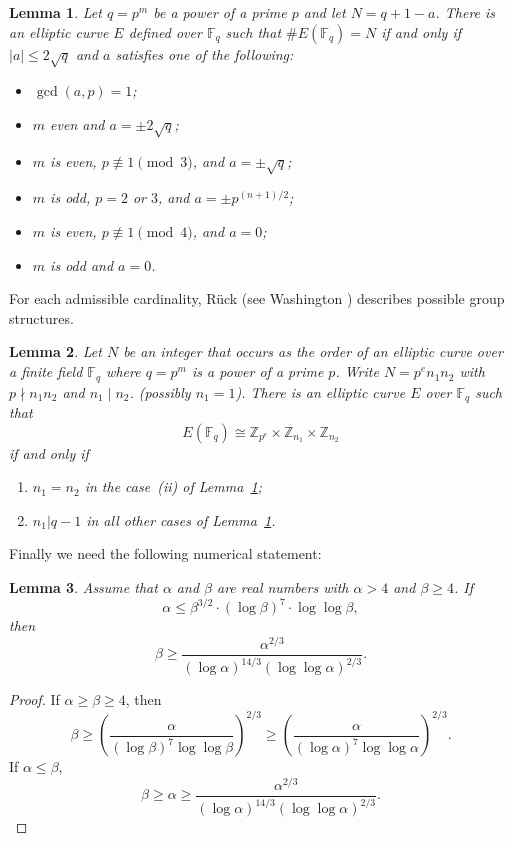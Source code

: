 \documentclass{amsart}
\def\Z{{\mathbb Z}}
\def\F{{\mathbb F}}
\newtheorem{lemma}{Lemma}
\begin{document}
\begin{lemma} 
\label{lem:Water}                          
 Let $q=p^m$ be a power of a prime $p$ and let $N = q + 1-a$. There is an elliptic 
curve $E$ defined over $\F_q$ such that $\#E(\F_q) = N$ if and only if $|a|\le 2\sqrt q$ 
and $a$ satisfies one of the following:
\begin{itemize} 
\item[(i)] $\gcd(a, p) = 1$;
\item[(ii)] $m$ even and $a=\pm 2\sqrt q$;
\item[(iii)] $m$ is even, $p\not\equiv 1 \pmod 3$, and $a = \pm\sqrt q$;
\item[(iv)] $m$ is odd, $p = 2$ or $3$, and $a = \pm p^{(n+1)/2}$;
\item[(v)] $m$ is even, $p\not\equiv 1 \pmod 4$, and $a = 0$;
\item[(vi)] $m$ is odd and $a = 0$.
\end{itemize}
\end{lemma}

For each admissible cardinality, R\"uck (see Washington \cite[Theorem~4.4, page~98]{washington})
describes possible group structures. 

\begin{lemma}
\label{lem:Ruck}
Let $N$ be an integer that occurs as the  order  of an elliptic curve 
over a finite field $\F_q$ where  $q=p^m$
is a power of a prime $p$.  Write 
$N = p^e n_1 n_2$ with $p\nmid n_1 n_2$ and $n_1\mid n_2$.
(possibly $n_1 = 1$). There is an elliptic curve $E$ over $\F_q$ such 
that
$$E(\F_q)\cong \Z_{p^e}\times\Z_{n_1}\times\Z_{n_2}$$
if and only if
\begin{enumerate}
\item $n_1 = n_2$ in the case~(ii) of Lemma~\ref{lem:Water};
\item $n_1 |q - 1$ in all other cases of Lemma~\ref{lem:Water}.
\end{enumerate}
\end{lemma}

Finally we need the following numerical statement:

\begin{lemma}\label{lem:numerical} Assume that $\alpha$ and $\beta$ are real numbers with $\alpha>4$ and $\beta\ge4$.
If 
$$\alpha\le \beta^{3/2}\cdot(\log\beta)^7\cdot\log\log\beta,$$
then
$$
\beta\ge\frac{\alpha^{2/3}}{(\log\alpha)^{14/3}(\log\log\alpha)^{2/3}}.$$
\end{lemma}

\begin{proof} If $\alpha\ge\beta\ge4$, then
$$\beta\ge\left(\frac\alpha{(\log\beta)^7\log\log\beta}\right)^{2/3}
\ge\left(\frac\alpha{(\log\alpha)^7\log\log\alpha}\right)^{2/3}.$$
If $\alpha\le\beta$, 
$$\beta\ge \alpha\ge\frac{\alpha^{2/3}}{(\log\alpha)^{14/3}(\log\log\alpha)^{2/3}}.$$
\end{proof}
\end{document}
